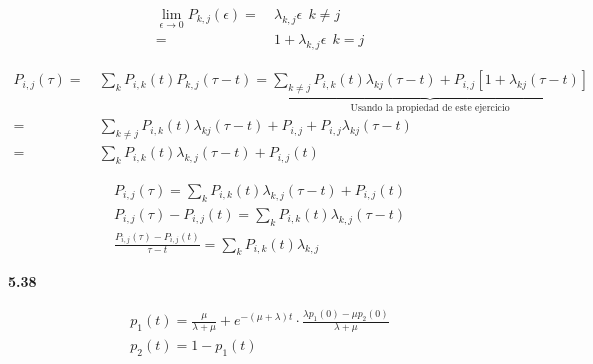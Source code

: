\begin{equation*}
\begin{split}
	\lim_{\epsilon \to 0} P_{k,j} (\epsilon) = \ & \lambda_{k,j} \epsilon	\	\ k \neq j	\\
	= \ & 1 + \lambda_{k,j} \epsilon 		\	\ k = j	
\end{split}
\end{equation*}

\begin{equation*}
\begin{split}
	P_{i,j} (\tau) = \ & \sum_{k} P_{i,k} (t) P_{k,j} (\tau - t) =  \underbrace{\sum_{k \neq j} P_{i,k} (t) \lambda_{kj} (\tau - t) + P_{i,j} \left[ 1 + \lambda_{kj} (\tau - t) \right]}_{\text{Usando la propiedad de este ejercicio}} \\
	= \ & \sum_{k \neq j} P_{i,k} (t) \lambda_{kj} (\tau - t) + P_{i,j} +  P_{i,j} \lambda_{kj} (\tau - t)	\\
	= \ & \sum_{k} P_{i,k} (t) \lambda_{k,j} (\tau - t) + P_{i,j}(t)
\end{split}
\end{equation*}

\vspace{0.5cm}

\begin{equation*}
\begin{gathered}
	P_{i,j} (\tau) = \sum_{k} P_{i,k} (t) \lambda_{k,j} (\tau - t) + P_{i,j}(t)	\\
	P_{i,j} (\tau) - P_{i,j}(t) = \sum_{k} P_{i,k} (t) \lambda_{k,j} (\tau - t) \\
	\frac{P_{i,j} (\tau) - P_{i,j}(t)}{\tau - t} = \sum_{k} P_{i,k} (t) \lambda_{k,j}
\end{gathered}
\end{equation*}

\vspace{1cm}

\textbf{5.38}

\begin{equation*}
\begin{gathered}
	p_1(t) = \frac{\mu}{\lambda + \mu} + e^{-\left( \mu + \lambda \right) t} \cdot \frac{\lambda p_1 (0) - \mu p_2 (0)}{\lambda + \mu}	\\
	p_2(t) = 1 - p_1(t)
\end{gathered}
\end{equation*}


